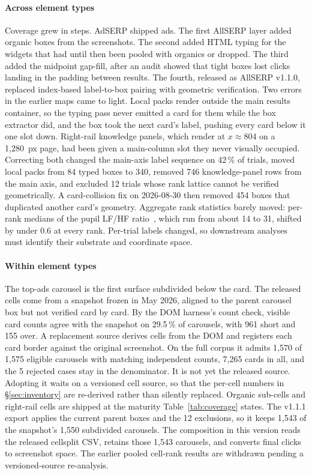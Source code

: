 \documentclass[sigconf,authorversion,natbib=true]{acmart}
\begin{document}
\paragraph{Across element types} Coverage grew in steps. AdSERP shipped ads. The first AllSERP layer added organic boxes from the screenshots. The second added HTML typing for the widgets that had until then been pooled with organics or dropped. The third added the midpoint gap-fill, after an audit showed that tight boxes lost clicks landing in the padding between results. The fourth, released as AllSERP v1.1.0, replaced index-based label-to-box pairing with geometric verification. Two errors in the earlier maps came to light. Local packs render outside the main results container, so the typing pass never emitted a card for them while the box extractor did, and the box took the next card's label, pushing every card below it one slot down. Right-rail knowledge panels, which render at $x \approx 804$ on a 1,280~px page, had been given a main-column slot they never visually occupied. Correcting both changed the main-axis label sequence on 42\,\% of trials, moved local packs from 84 typed boxes to 340, removed 746 knowledge-panel rows from the main axis, and excluded 12 trials whose rank lattice cannot be verified geometrically. A card-collision fix on 2026-08-30 then removed 454 boxes that duplicated another card's geometry. Aggregate rank statistics barely moved: per-rank medians of the pupil LF/HF ratio~\cite{duchowski2026rtlfhf}, which run from about 14 to 31, shifted by under 0.6 at every rank. Per-trial labels changed, so downstream analyses must identify their substrate and coordinate space.

\paragraph{Within element types} The top-ads carousel is the first surface subdivided below the card. The released cells come from a snapshot frozen in May 2026, aligned to the parent carousel box but not verified card by card. By the DOM harness's count check, visible card counts agree with the snapshot on 29.5\,\% of carousels, with 961 short and 155 over. A replacement source derives cells from the DOM and registers each card border against the original screenshot. On the full corpus it admits 1,570 of 1,575 eligible carousels with matching independent counts, 7,265 cards in all, and the 5 rejected cases stay in the denominator. It is not yet the released source. Adopting it waits on a versioned cell source, so that the per-cell numbers in \S\ref{sec:inventory} are re-derived rather than silently replaced. Organic sub-cells and right-rail cells are shipped at the maturity Table~\ref{tab:coverage} states. The v1.1.1 export applies the current parent boxes and the 12 exclusions, so it keeps 1,543 of the snapshot's 1,550 subdivided carousels. The composition in this version reads the released cellsplit CSV, retains those 1,543 carousels, and converts final clicks to screenshot space. The earlier pooled cell-rank results are withdrawn pending a versioned-source re-analysis.
\end{document}
